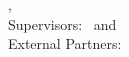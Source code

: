 \AddToShipoutPicture*{\TitleWatermark}%
\hfill
\vfill
{
	\small
	\textbf{\thesisName} \\
	\textit{\thesisTitle} \\
	\thesisSubject, \thesisDate \\
	Supervisors: \thesisExternalSupervisor\ and \thesisInternalSupervisor \\
	External Partners: \thesisCollab \\[1.5em]
	\textbf{\thesisUniversity} \\
	\textit{\thesisFaculty} \\
	\thesisInstitute \\
	\thesisAddress \\
	\thesisPostal\ \thesisCity
}
